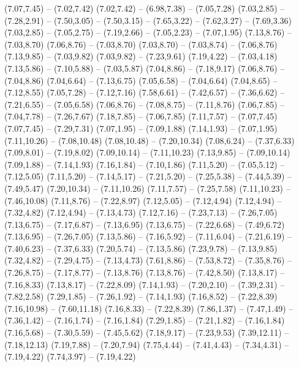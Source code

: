 {  (7.07,7.45) -- (7.02,7.42)
  (7.02,7.42) -- (6.98,7.38) -- (7.05,7.28)
  (7.03,2.85) -- (7.28,2.91) -- (7.50,3.05) -- (7.50,3.15) -- (7.65,3.22) -- (7.62,3.27) -- (7.69,3.36)
  (7.03,2.85) -- (7.05,2.75) -- (7.19,2.66) -- (7.05,2.23) -- (7.07,1.95)
  (7.13,8.76) -- (7.03,8.70)
  (7.06,8.76) -- (7.03,8.70)
  (7.03,8.70) -- (7.03,8.74) -- (7.06,8.76)
  (7.13,9.85) -- (7.03,9.82)
  (7.03,9.82) -- (7.23,9.61)
  (7.19,4.22) -- (7.03,4.18)
  (7.13,5.86) -- (7.10,5.88) -- (7.03,5.87)
  (7.04,8.86) -- (7.18,9.17)
  (7.06,8.76) -- (7.04,8.86)
  (7.04,6.64) -- (7.13,6.75)
  (7.05,6.58) -- (7.04,6.64)
  (7.04,8.65) -- (7.12,8.55)
  (7.05,7.28) -- (7.12,7.16)
  (7.58,6.61) -- (7.42,6.57) -- (7.36,6.62) -- (7.21,6.55) -- (7.05,6.58)
  (7.06,8.76) -- (7.08,8.75) -- (7.11,8.76)
  (7.06,7.85) -- (7.04,7.78) -- (7.26,7.67)
  (7.18,7.85) -- (7.06,7.85)
  (7.11,7.57) -- (7.07,7.45)
  (7.07,7.45) -- (7.29,7.31)
  (7.07,1.95) -- (7.09,1.88)
  (7.14,1.93) -- (7.07,1.95)
  (7.11,10.26) -- (7.08,10.48)
  (7.08,10.48) -- (7.20,10.34)
  (7.08,6.24) -- (7.37,6.33)
  (7.09,8.01) -- (7.19,8.02)
  (7.09,10.14) -- (7.11,10.23)
  (7.13,9.85) -- (7.09,10.14)
  (7.09,1.88) -- (7.14,1.93)
  (7.16,1.84) -- (7.10,1.86)
  (7.11,5.20) -- (7.05,5.12) -- (7.12,5.05)
  (7.11,5.20) -- (7.14,5.17) -- (7.21,5.20) -- (7.25,5.38) -- (7.44,5.39) -- (7.49,5.47)
  (7.20,10.34) -- (7.11,10.26)
  (7.11,7.57) -- (7.25,7.58)
  (7.11,10.23) -- (7.46,10.08)
  (7.11,8.76) -- (7.22,8.97)
  (7.12,5.05) -- (7.12,4.94)
  (7.12,4.94) -- (7.32,4.82)
  (7.12,4.94) -- (7.13,4.73)
  (7.12,7.16) -- (7.23,7.13) -- (7.26,7.05)
  (7.13,6.75) -- (7.17,6.87) -- (7.13,6.95)
  (7.13,6.75) -- (7.22,6.68) -- (7.49,6.72)
  (7.13,6.95) -- (7.26,7.05)
  (7.13,5.86) -- (7.16,5.92) -- (7.11,6.04) -- (7.21,6.19) -- (7.40,6.23) -- (7.37,6.33)
  (7.20,5.74) -- (7.13,5.86)
  (7.23,9.78) -- (7.13,9.85)
  (7.32,4.82) -- (7.29,4.75) -- (7.13,4.73)
  (7.61,8.86) -- (7.53,8.72) -- (7.35,8.76) -- (7.26,8.75) -- (7.17,8.77) -- (7.13,8.76)
  (7.13,8.76) -- (7.42,8.50)
  (7.13,8.17) -- (7.16,8.33)
  (7.13,8.17) -- (7.22,8.09)
  (7.14,1.93) -- (7.20,2.10) -- (7.39,2.31) -- (7.82,2.58)
  (7.29,1.85) -- (7.26,1.92) -- (7.14,1.93)
  (7.16,8.52) -- (7.22,8.39)
  (7.16,10.98) -- (7.60,11.18)
  (7.16,8.33) -- (7.22,8.39)
  (7.86,1.37) -- (7.47,1.49) -- (7.36,1.42) -- (7.16,1.74) -- (7.16,1.84)
  (7.29,1.85) -- (7.21,1.82) -- (7.16,1.84)
  (7.16,5.68) -- (7.30,5.59) -- (7.45,5.62)
  (7.18,9.17) -- (7.23,9.53)
  (7.39,12.11) -- (7.18,12.13)
  (7.19,7.88) -- (7.20,7.94)
  (7.75,4.44) -- (7.41,4.43) -- (7.34,4.31) -- (7.19,4.22)
  (7.74,3.97) -- (7.19,4.22)
}
